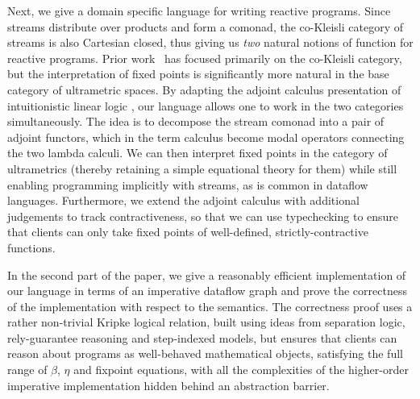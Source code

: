 \documentclass[nocopyrightspace,preprint]{sigplanconf}
\begin{document}
Next, we give a domain specific language for writing reactive
  programs. Since streams distribute over products and form a comonad,
  the co-Kleisli category of streams is also Cartesian closed, thus
  giving us \emph{two} natural notions of function for reactive
  programs.  Prior work~\cite{coiterative, essence-dataflow} has
  focused primarily on the co-Kleisli category, but the interpretation of fixed
  points is significantly more natural in the base category of ultrametric spaces. By adapting the adjoint calculus presentation of intuitionistic linear logic \cite{benton:lnl,benton-wadler}, our language allows one to work in the two categories simultaneously.
The idea is to decompose the stream comonad into a pair of
  adjoint functors, which in the term calculus become modal operators
  connecting the two lambda calculi. We can then interpret fixed
  points in the category of ultrametrics (thereby retaining a simple
  equational theory for them) while still enabling programming
  implicitly with streams, as is common in dataflow languages. Furthermore, we extend the adjoint
  calculus with additional judgements to track contractiveness, so
  that we can use typechecking to ensure that clients can only take
  fixed points of well-defined, strictly-contractive functions.

In the second part of the paper, we give a reasonably efficient
implementation of our language in terms of an imperative dataflow
graph and prove the correctness of the implementation with respect to
the semantics. The correctness proof uses a rather non-trivial Kripke
logical relation, built using ideas from separation logic,
rely-guarantee reasoning and step-indexed models, but ensures that
clients can reason about programs as well-behaved mathematical
objects, satisfying the full range of $\beta$, $\eta$ and fixpoint
equations, with all the complexities of the higher-order imperative
implementation hidden behind an abstraction barrier.

\end{document}
